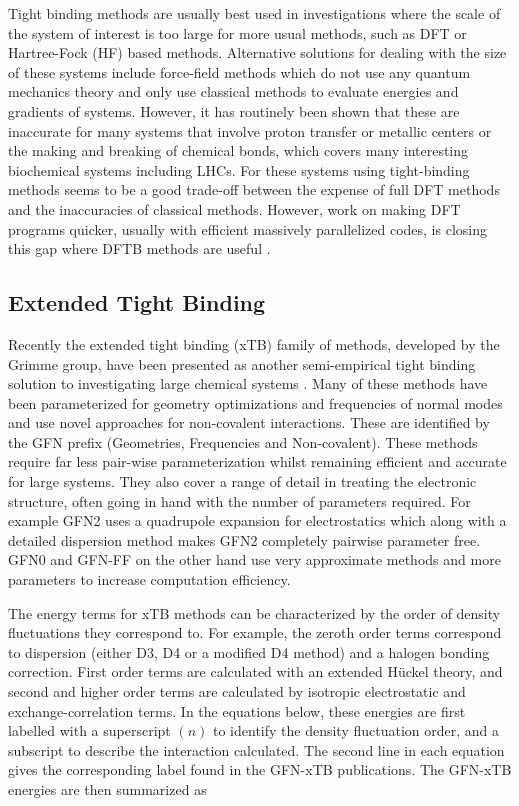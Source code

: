 Tight binding methods are usually best used in investigations where the scale of 
the  system of interest is too large for more usual methods, such as DFT or Hartree-Fock 
(HF) based methods. Alternative solutions for dealing with the size of these systems 
include force-field methods which do not use any quantum mechanics theory and only
use classical methods to evaluate energies and gradients of systems. However, it
has routinely been shown that these are inaccurate for many systems that involve 
proton transfer or metallic centers or the making and breaking of chemical bonds\cite{Salomon-Ferrer2013},
which covers many interesting biochemical systems including LHCs. For these systems
using tight-binding methods seems to be a good trade-off between the expense of 
full DFT methods and the inaccuracies of classical methods. However, work on making 
DFT programs quicker, usually with efficient massively parallelized codes, is closing 
this gap where DFTB methods are useful \cite{Manathunga2020}.

\subsection{Extended Tight Binding}
\label{subsec:xtb_methods}

Recently the extended tight binding (xTB) family of methods, developed by the Grimme 
group, have been presented as another semi-empirical tight binding solution to investigating 
large chemical systems \cite{Bannwarth2020, Bannwarth2019, Grimme2017, Pracht2019, Grimme2016, Spicher2020a}.
Many of these methods have been parameterized for geometry optimizations and frequencies 
of normal modes and use novel approaches for non-covalent interactions. These are
identified by the GFN prefix (Geometries, Frequencies and Non-covalent). These methods
require far less pair-wise parameterization whilst remaining efficient and accurate
for large systems. They also cover a range of detail in treating the electronic
structure, often going in hand with the number of parameters required. For example
GFN2 uses a quadrupole expansion for electrostatics which along with a detailed 
dispersion method makes GFN2 completely pairwise parameter free. GFN0 and GFN-FF
on the other hand use very approximate methods and more parameters to increase computation
efficiency.

The energy terms for xTB methods can be characterized by the order of density fluctuations 
they correspond to. For example, the zeroth order terms correspond to dispersion 
(either D3\cite{Grimme2010}, D4\cite{Caldeweyher2020} or a modified D4 method) and
a halogen bonding correction. First order terms are calculated with an extended 
H\"{u}ckel theory, and second and higher order terms are calculated by isotropic
electrostatic and exchange-correlation terms. In the equations below, these energies
are first labelled with a superscript $\left(n\right)$ to identify the density fluctuation 
order, and a subscript to describe the interaction calculated. The second line in
each equation gives the corresponding label found in the GFN-xTB publications. The
GFN-xTB energies are then summarized as

